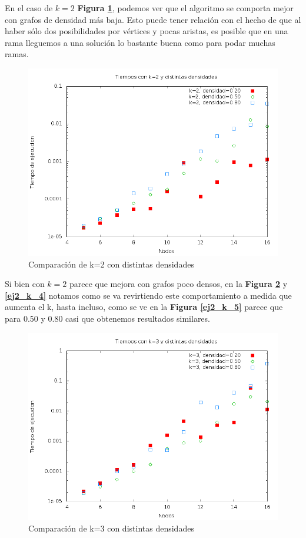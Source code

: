 En el caso de $k=2$ \textbf{Figura \ref{ej2_k_2}}, podemos ver que el algoritmo se comporta mejor con grafos de densidad m\'as baja. Esto puede tener relaci\'on con el hecho de que al haber s\'olo dos posibilidades por v\'ertices y pocas aristas, es posible que en una rama lleguemos a una soluci\'on lo bastante buena como para podar muchas ramas.

\begin{figure}[H]
	\begin{center}
		\includegraphics[scale=0.4]{ej2/k_2.png}
	\end{center}
	\caption{Comparaci\'on de k=2 con distintas densidades}
	\label{ej2_k_2}
\end{figure}

Si bien con $k=2$ parece que mejora con grafos poco densos, en la \textbf{Figura \ref{ej2_k_3}} y \textbf{\ref{ej2_k_4}} notamos como se va revirtiendo este comportamiento a medida que aumenta el k, hasta incluso, como se ve en la \textbf{Figura \ref{ej2_k_5}} parece que para 0.50 y 0.80 casi que obtenemos resultados similares.

\begin{figure}[H]
	\begin{center}
		\includegraphics[scale=0.4]{ej2/k_3.png}
	\end{center}
	\caption{Comparaci\'on de k=3 con distintas densidades}
	\label{ej2_k_3}
\end{figure}

